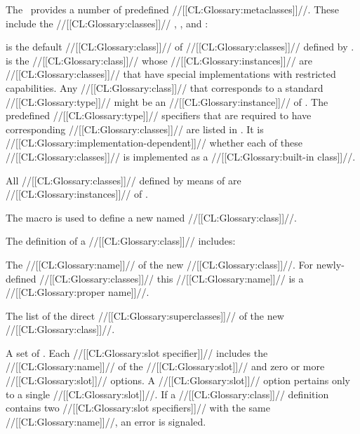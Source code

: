 \endsubSection%


The \CLOS\ provides a number of predefined //[[CL:Glossary:metaclasses]]//.  These include the //[[CL:Glossary:classes]]// ,  , and :

\beginlist

\itemitem{\bull}  is the default //[[CL:Glossary:class]]// of  //[[CL:Glossary:classes]]// defined by .
                         \itemitem{\bull}  is the //[[CL:Glossary:class]]// whose //[[CL:Glossary:instances]]// are //[[CL:Glossary:classes]]// that have special implementations with restricted capabilities.  Any //[[CL:Glossary:class]]// that corresponds to a standard //[[CL:Glossary:type]]// might be an //[[CL:Glossary:instance]]// of . The predefined //[[CL:Glossary:type]]// specifiers that are required to have corresponding //[[CL:Glossary:classes]]// are listed in \figref\ClassTypeCorrespondence.   It is //[[CL:Glossary:implementation-dependent]]// whether each of these //[[CL:Glossary:classes]]//  is implemented as a //[[CL:Glossary:built-in class]]//.

\itemitem{\bull}                      All //[[CL:Glossary:classes]]// defined by means of  are //[[CL:Glossary:instances]]// of . \endlist

\endsubsubsection%

            The macro  is used to define a new named //[[CL:Glossary:class]]//.  

The definition of a //[[CL:Glossary:class]]// includes:

\beginlist

\itemitem{\bull} The //[[CL:Glossary:name]]// of the new //[[CL:Glossary:class]]//. 
  For newly-defined //[[CL:Glossary:classes]]// this //[[CL:Glossary:name]]// is a //[[CL:Glossary:proper name]]//.

\itemitem{\bull} The list of the direct //[[CL:Glossary:superclasses]]// of the new //[[CL:Glossary:class]]//. 

\itemitem{\bull} A set of .
  Each //[[CL:Glossary:slot specifier]]// includes the //[[CL:Glossary:name]]// of the //[[CL:Glossary:slot]]// 
  and zero or more //[[CL:Glossary:slot]]// options.  A //[[CL:Glossary:slot]]// option pertains 
  only to a single //[[CL:Glossary:slot]]//.  If a //[[CL:Glossary:class]]// definition contains
  two //[[CL:Glossary:slot specifiers]]// with the same //[[CL:Glossary:name]]//, an error is signaled.

